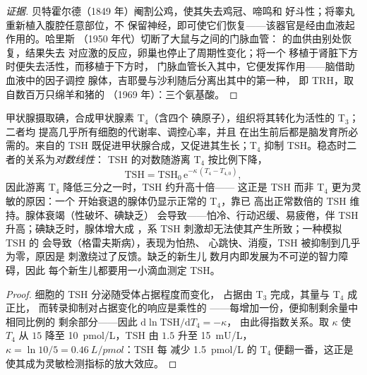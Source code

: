 \begin{proof}[证据]
贝特霍尔德（1849 年）阉割公鸡，使其失去鸡冠、啼鸣和
好斗性；将睾丸重新植入腹腔任意部位，不
保留神经，即可使它们恢复——该器官是经由血液起作用的。哈里斯
（1950 年代）切断了大鼠与之间的门脉血管：
的血供由别处恢复，结果失去
对应激的反应，卵巢也停止了周期性变化；将一个
移植于肾脏下方时便失去活性，而移植于下方时，
门脉血管长入其中，它便发挥作用——脑借助血液中的因子调控
腺体，吉耶曼与沙利随后分离出其中的第一种，
即 TRH，取自数百万只绵羊和猪的
（1969 年）：三个氨基酸。
\end{proof}

\begin{proposition}[反馈与甲状腺的对数线性关系]\label{prop:b3:endocrinology:thyroid}
甲状腺摄取碘，合成甲状腺素 T$_{4}$（含四个
碘原子），组织将其转化为活性的 T$_{3}$；二者均
提高几乎所有细胞的代谢率、调控心率，并且
在出生前后都是脑发育所必需的。来自的 TSH
既促进甲状腺合成，又促进其生长；T$_{4}$
抑制 TSH。稳态时二者的关系为\emph{对数线性}：
TSH 的对数随游离 T$_{4}$ 按比例下降，
\[
\text{TSH} = \text{TSH}_{0}\,\mathrm{e}^{-\kappa\,(T_{4} - T_{4,0})},
\]
因此游离 T$_{4}$ 降低三分之一时，TSH 约升高十倍——
这正是 TSH 而非 T$_{4}$ 更为灵敏的原因：一个
开始衰退的腺体仍显示正常的 T$_{4}$，靠已
高出正常数倍的 TSH 维持。腺体衰竭（性破坏、碘缺乏）
会导致\emph{}——怕冷、行动迟缓、易疲倦，伴
TSH 升高；碘缺乏时，腺体增大成
\emph{}，系 TSH 刺激却无法使其产生所致；一种模拟 TSH 的
会导致\emph{}（格雷夫斯病），表现为怕热、
心跳快、消瘦，TSH 被抑制到几乎为零，原因是
刺激绕过了反馈。缺乏的新生儿
数月内即发展为不可逆的智力障碍，因此
每个新生儿都要用一小滴血测定 TSH。
\end{proposition}
\begin{proof}
细胞的 TSH 分泌随受体占据程度而变化，
占据由 T$_{3}$ 完成，其量与 T$_{4}$ 成正比，
而转录抑制对占据变化的响应是乘性的
——每增加一份，便抑制剩余量中相同比例的
剩余部分——因此 $\mathrm{d}\ln\text{TSH}/\mathrm{d}T_{4} = -\kappa$，
由此得指数关系。取 $\kappa$ 使 $T_{4}$ 从
$15$ 降至 \qty{10}{pmol/L}，TSH 由 $1.5$ 升至 \qty{15}{mU/L}，
$\kappa = \ln 10/5 = \qty{0.46}{L/pmol}$：TSH 每
减少 \qty{1.5}{pmol/L} 的 T$_{4}$ 便翻一番，这正是
使其成为灵敏检测指标的放大效应。
\end{proof}

